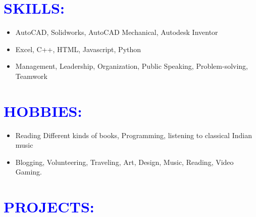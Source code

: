 \documentclass{article}
\begin{document}
\begin{multicols}{2}
\begin{flushleft}
\end{flushleft}
\vspace{5pt}


\section*{\large{\textcolor{blue}{\uppercase{Skills:}}}}

\begin{flushleft}
\begin{itemize}[noitemsep,nolistsep]
	\item AutoCAD, Solidworks, AutoCAD Mechanical, Autodesk Inventor
	\item Excel, C++, HTML, Javascript, Python
	\item Management, Leadership, Organization, Public Speaking, Problem-solving, Teamwork
\end{itemize}
\end{flushleft}
\vspace{5pt}

\section*{\large{\textcolor{blue}{\uppercase{Hobbies:}}}}

\begin{flushleft}
\begin{itemize}[noitemsep,nolistsep]
	\item Reading Different kinds of books, Programming, listening to classical Indian music
	\item Blogging, Volunteering, Traveling, Art, Design, Music, Reading, Video Gaming.
\end{itemize}
\end{flushleft}
\vspace{5pt}

\section*{\large{\textcolor{blue}{\uppercase{projects:}}}}



\end{multicols}
\end{document}
